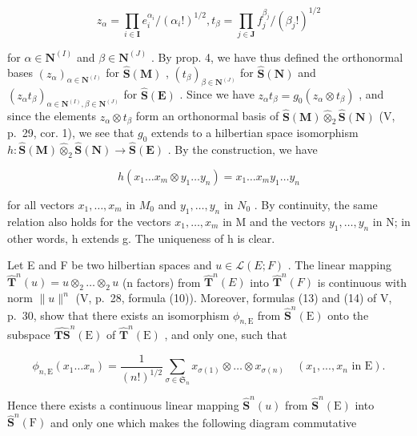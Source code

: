 \[
z _ {\alpha} = \prod_ {i \in \mathbf {I}} e _ {i} ^ {\alpha_ {i}} / (\alpha_ {i}!) ^ {1 / 2}, t _ {\beta} = \prod_ {j \in \mathbf {J}} f _ {j} ^ {\beta _ {j}} / (\beta_ {j}!) ^ {1 / 2}
\]

for \(\alpha \in \mathbf{N}^{(I)}\) and \(\beta \in \mathbf{N}^{(J)}\) . By prop. 4, we have thus defined the orthonormal bases \((z_{\alpha})_{\alpha \in \mathbf{N}^{(I)}}\) for \(\hat{\mathbf{S}}(\mathbf{M})\) , \((t_{\beta})_{\beta \in \mathbf{N}^{(J)}}\) for \(\hat{\mathbf{S}}(\mathbf{N})\) and \((z_{\alpha}t_{\beta})_{\alpha \in \mathbf{N}^{(I)},\beta \in \mathbf{N}^{(J)}}\) for \(\hat{\mathbf{S}}(\mathbf{E})\) . Since we have \(z_{\alpha}t_{\beta} = g_0(z_{\alpha}\otimes t_{\beta})\) , and since the elements \(z_{\alpha}\otimes t_{\beta}\) form an orthonormal basis of \(\hat{\mathbf{S}}(\mathbf{M})\hat{\otimes}_2\hat{\mathbf{S}}(\mathbf{N})\) (V, p.~29, cor. 1), we see that \(g_0\) extends to a hilbertian space isomorphism \(h:\hat{\mathbf{S}}(\mathbf{M})\hat{\otimes}_2\hat{\mathbf{S}}(\mathbf{N})\to \hat{\mathbf{S}}(\mathbf{E})\) . By the construction, we have

\[
h (x _ {1} \dots x _ {m} \otimes y _ {1} \dots y _ {n}) = x _ {1} \dots x _ {m} y _ {1} \dots y _ {n}
\]

for all vectors \(x_{1}, \ldots, x_{m}\) in \(M_{0}\) and \(y_{1}, \ldots, y_{n}\) in \(N_{0}\) . By continuity, the same relation also holds for the vectors \(x_{1}, \ldots, x_{m}\) in M and the vectors \(y_{1}, \ldots, y_{n}\) in N; in other words, h extends g. The uniqueness of h is clear.

Let E and F be two hilbertian spaces and \(u \in \mathcal{L}(E; F)\) . The linear mapping \(\hat{\mathbf{T}}^{n}(u) = u \otimes_{2} \ldots \otimes_{2} u\) (n factors) from \(\hat{\mathbf{T}}^{n}(E)\) into \(\hat{\mathbf{T}}^{n}(F)\) is continuous with norm \(\|u\|^{n}\) (V, p.~28, formula (10)). Moreover, formulas (13) and (14) of V, p.~30, show that there exists an isomorphism \(\phi_{n,\mathrm{E}}\) from \(\hat{\mathbf{S}}^n (\mathrm{E})\) onto the subspace \(\widehat{\mathbf{T}\mathbf{S}}^n (\mathrm{E})\) of \(\hat{\mathbf{T}}^n (\mathrm{E})\) , and only one, such that

\[
\phi_ {n, \mathrm{E}} (x _ {1} \dots x _ {n}) = \frac {1}{(n !) ^ {1 / 2}} \sum_ {\sigma \in \mathfrak {S} _ {n}} x _ {\sigma (1)} \otimes \dots \otimes x _ {\sigma (n)} \quad (x _ {1},..., x _ {n} \text { in } \mathrm{E}).\tag{18}
\]

Hence there exists a continuous linear mapping \(\hat{\mathbf{S}}^{n}(u)\) from \(\hat{\mathbf{S}}^{n}(\mathrm{E})\) into \(\hat{\mathbf{S}}^{n}(\mathrm{F})\) and only one which makes the following diagram commutative

